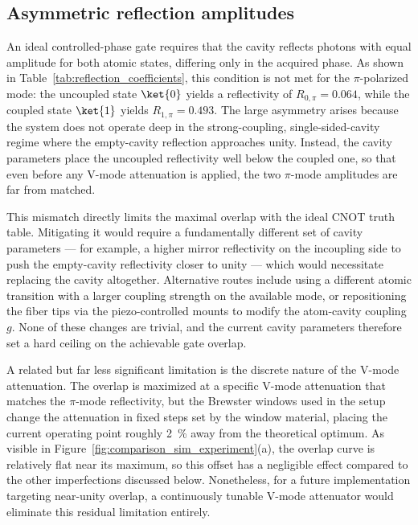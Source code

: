 \subsection{Asymmetric reflection amplitudes}
\label{subsubsec:asymmetric_reflectivities}

An ideal controlled-phase gate requires that the cavity reflects photons with equal amplitude for both atomic states, differing only in the acquired phase. As shown in Table~\ref{tab:reflection_coefficients}, this condition is not met for the $\pi$-polarized mode: the uncoupled state $\ket{0}$ yields a reflectivity of $R_{0,\pi} = \num{0.064}$, while the coupled state $\ket{1}$ yields $R_{1,\pi} = \num{0.493}$. The large asymmetry arises because the system does not operate deep in the strong-coupling, single-sided-cavity regime where the empty-cavity reflection approaches unity. Instead, the cavity parameters place the uncoupled reflectivity well below the coupled one, so that even before any V-mode attenuation is applied, the two $\pi$-mode amplitudes are far from matched.

This mismatch directly limits the maximal overlap with the ideal CNOT truth table. Mitigating it would require a fundamentally different set of cavity parameters — for example, a higher mirror reflectivity on the incoupling side to push the empty-cavity reflectivity closer to unity — which would necessitate replacing the cavity altogether. Alternative routes include using a different atomic transition with a larger coupling strength on the available mode, or repositioning the fiber tips via the piezo-controlled mounts to modify the atom-cavity coupling $g$. None of these changes are trivial, and the current cavity parameters therefore set a hard ceiling on the achievable gate overlap.

A related but far less significant limitation is the discrete nature of the V-mode attenuation. The overlap is maximized at a specific V-mode attenuation that matches the $\pi$-mode reflectivity, but the Brewster windows used in the setup change the attenuation in fixed steps set by the window material, placing the current operating point roughly \SI{2}{\percent} away from the theoretical optimum. As visible in Figure~\ref{fig:comparison_sim_experiment}(a), the overlap curve is relatively flat near its maximum, so this offset has a negligible effect compared to the other imperfections discussed below. Nonetheless, for a future implementation targeting near-unity overlap, a continuously tunable V-mode attenuator would eliminate this residual limitation entirely.


